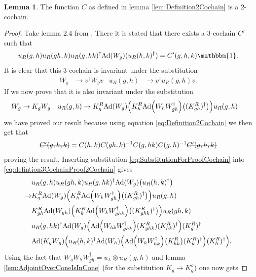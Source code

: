\documentclass[12pt,a4paper,twoside]{article}
\newcommand{\stkout}[1]{\ifmmode\text{\sout{\ensuremath{#1}}}\else\sout{#1}\fi}
\let\originalleft\left
\let\originalright\right
\renewcommand{\left}{\mathopen{}\mathclose\bgroup\originalleft}
\renewcommand{\right}{\aftergroup\egroup\originalright}
\newcommand{\id}{\mathbbm{1}}
\newcommand{\Ad}[1]{\textrm{Ad}\left(#1\right)}
\theoremstyle{definition}
\newtheorem{lemma}[theorem]{Lemma}
\numberwithin{equation}{section}
\begin{document}
\begin{lemma}
	The function $C$ as defined in lemma \ref{lem:Definition2Cochain} is a 2-cochain.
\end{lemma}
\begin{proof}
	Take lemma 2.4 from \cite{ogata2021h3gmathbb}. There it is stated that there exists a 3-cochain $C'$ such that
	\begin{equation}\label{eq:defintion3CochainProof2Cochain}
		u_R(g,h)u_R(gh,k)u_R(g,hk)^\dagger\Ad{W_g}(u_R(h,k)^\dagger)=C'(g,h,k)\id.
	\end{equation}
	It is clear that this 3-cochain is invariant under the substitution
	\begin{align}
		W_g&\rightarrow v^\dagger W_g v&u_R(g,h)&\rightarrow v^\dagger u_R(g,h)v.
	\end{align}
	If we now prove that it is also invariant under the substitution
	\begin{align}\label{eq:SubstitutionForProofCochain}
		W_g&\rightarrow K_g W_g&u_R(g,h)&\rightarrow K_g^R\Ad{W_g}\left(K_h^R\Ad{W_hW_{gh}^\dagger}\left((K_{gh}^R)^\dagger\right)\right)u_
		R(g,h)
	\end{align}
	we have proved our result because using equation \eqref{eq:Definition2Cochain} we then get that
	\begin{equation}
		\stkout{C'(g,h,k)}=C(h,k)C(gh,k)^{-1}C(g,hk)C(g,h)^{-1}\stkout{C'(g,h,k)}
	\end{equation}
	proving the result. Inserting substitution \eqref{eq:SubstitutionForProofCochain} into \eqref{eq:defintion3CochainProof2Cochain} gives
	\begin{align}
		&u_R(g,h)u_R(gh,k)u_R(g,hk)^\dagger\Ad{W_g}\left(u_R(h,k)^\dagger\right)\\
		\rightarrow&K_g^R\Ad{W_g}\left(K_h^R\Ad{W_hW_{gh}^\dagger}\left((K_{gh}^R)^\dagger\right)\right)u_
		R(g,h)\\
		\nonumber
		&K_{gh}^R\Ad{W_{gh}}\left(K_k^R\Ad{W_kW_{ghk}^\dagger}\left((K_{ghk}^R)^\dagger\right)\right)u_
		R(gh,k)\\
		\nonumber
		&u_R(g,hk)^\dagger \Ad{W_g}\left( \Ad{W_{hk}W_{ghk}^\dagger}(K^R_{ghk})(K^R_{hk})^{\dagger} \right)(K^R_g)^\dagger\\
		\nonumber
		&\Ad{K_gW_g}\left(u_R(h,k)^\dagger \Ad{W_h}\left(\Ad{W_kW_{hk}^\dagger}\left(K_{hk}^R\right)(K^R_k)^\dagger\right)(K^R_h)^\dagger\right).
	\end{align}
	Using the fact that $W_gW_hW_{gh}^\dagger=u_L\otimes u_R(g,h)$ and lemma \ref{lem:AdjointOverConeIsInCone} (for the substitution $K_g\rightarrow K_g^\sigma$) one now gets

\end{proof}
\end{document}
